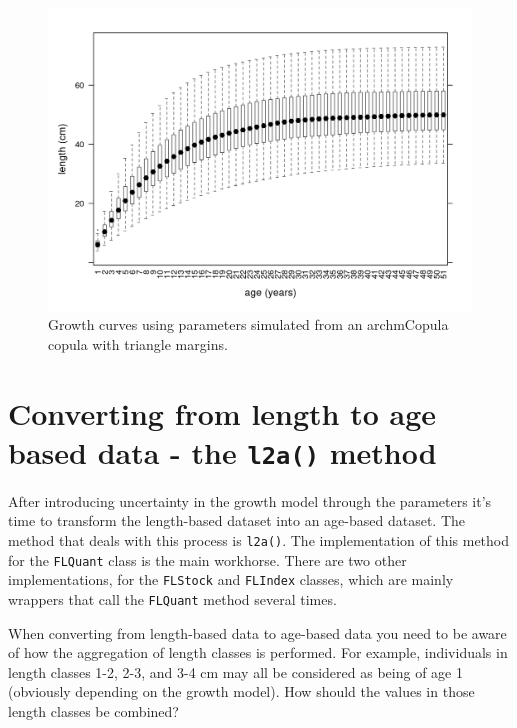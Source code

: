 \documentclass[
]{book}
\begin{document}
\begin{figure}
\centering
\includegraphics{_bookdown_files/_main_files/figure-html/plotcoptrigrowth-1.png}
\caption{\label{fig:plotcoptrigrowth}Growth curves using parameters simulated from an archmCopula copula with triangle margins.}
\end{figure}

\hypertarget{converting-from-length-to-age-based-data---the-l2a-method}{%
\section{\texorpdfstring{Converting from length to age based data - the \texttt{l2a()} method}{Converting from length to age based data - the l2a() method}}\label{converting-from-length-to-age-based-data---the-l2a-method}}

After introducing uncertainty in the growth model through the parameters it's time to transform the length-based dataset into an age-based dataset. The method that deals with this process is \texttt{l2a()}. The implementation of this method for the \texttt{FLQuant} class is the main workhorse. There are two other implementations, for the \texttt{FLStock} and \texttt{FLIndex} classes, which are mainly wrappers that call the \texttt{FLQuant} method several times.

When converting from length-based data to age-based data you need to be aware of how the aggregation of length classes is performed. For example, individuals in length classes 1-2, 2-3, and 3-4 cm may all be considered as being of age 1 (obviously depending on the growth model). How should the values in those length classes be combined?
\end{document}
